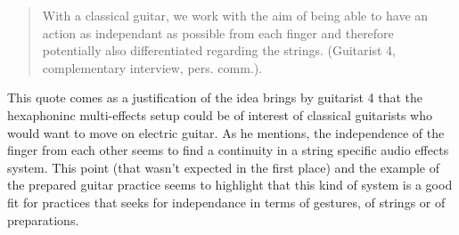 \documentclass{article}
\begin{document}
\begin{quote}
With a classical guitar, we work with the aim of being able to have an action as independant as possible from each finger and therefore potentially also differentiated regarding the strings. (Guitarist 4, complementary interview, pers. comm.).
\end{quote}

This quote comes as a justification of the idea brings by guitarist 4 that the hexaphoninc multi-effects setup could be of interest of classical guitarists who would want to move on electric guitar. As he mentions, the independence of the finger from each other seems to find a continuity in a string specific audio effects system. This point (that wasn't expected in the first place) and the example of the prepared guitar practice seems to highlight that this kind of system is a good fit for practices that seeks for independance in terms of gestures, of strings or of preparations.

%


\end{document}
